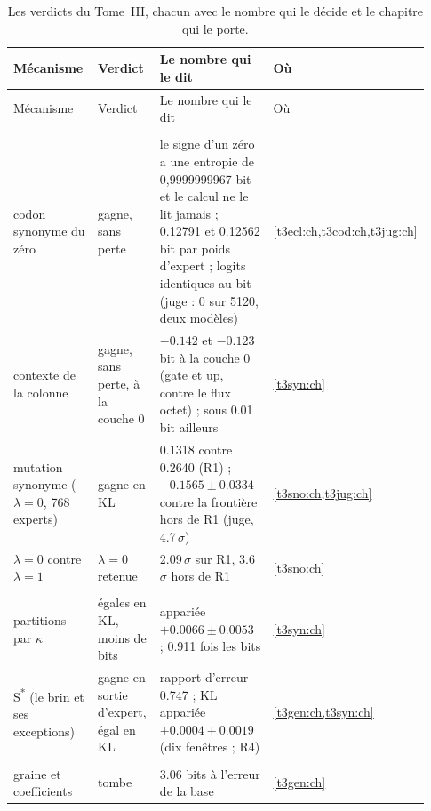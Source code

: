 \begingroup\footnotesize
\setlength{\tabcolsep}{4pt}
\begin{longtable}{@{}>{\raggedright\arraybackslash}p{0.25\linewidth}>{\raggedright\arraybackslash}p{0.17\linewidth}>{\raggedright\arraybackslash}p{0.40\linewidth}>{\raggedright\arraybackslash}p{0.11\linewidth}@{}}
\caption[Les verdicts du Tome~III]{Les verdicts du Tome~III, chacun avec le nombre qui le décide et le chapitre qui le porte.}\label{t3dis:tab:verdicts}\\
\toprule
Mécanisme & Verdict & Le nombre qui le dit & Où \\
\midrule
\endfirsthead
\toprule
Mécanisme & Verdict & Le nombre qui le dit & Où \\
\midrule
\endhead
\multicolumn{4}{@{}l}{\textsf{\bfseries Gagnent (les synonymes)}} \\
codon synonyme du zéro & gagne, sans perte & le signe d'un zéro a une entropie de 0,9999999967 bit et le calcul ne le lit jamais ; \num{0.12791} et \num{0.12562} bit par poids d'expert ; logits identiques au bit (juge : 0 sur \num{5120}, deux modèles) & \cref{t3ecl:ch,t3cod:ch,t3jug:ch} \\
contexte de la colonne & gagne, sans perte, à la couche 0 & $-\num{0.142}$ et $-\num{0.123}$ bit à la couche 0 (gate et up, contre le flux octet) ; sous \num{0.01} bit ailleurs & \cref{t3syn:ch} \\
mutation synonyme ($\lambda = 0$, 768 experts) & gagne en KL & \num{0.1318} contre \num{0.2640} (R1) ; $-\num{0.1565} \pm \num{0.0334}$ contre la frontière hors de R1 (juge, \num{4.7}\,$\sigma$) & \cref{t3sno:ch,t3jug:ch} \\
$\lambda = 0$ contre $\lambda = 1$ & $\lambda = 0$ retenue & \num{2.09}\,$\sigma$ sur R1, \num{3.6}\,$\sigma$ hors de R1 & \cref{t3sno:ch} \\
\multicolumn{4}{@{}l}{\textsf{\bfseries Égaux}} \\
partitions par $\kappa$ & égales en KL, moins de bits & appariée $+\num{0.0066} \pm \num{0.0053}$ ; \num{0.911} fois les bits & \cref{t3syn:ch} \\
S\textsuperscript{*} (le brin et ses exceptions) & gagne en sortie d'expert, égal en KL & rapport d'erreur \num{0.747} ; KL appariée $+\num{0.0004} \pm \num{0.0019}$ (dix fenêtres ; R4) & \cref{t3gen:ch,t3syn:ch} \\
\multicolumn{4}{@{}l}{\textsf{\bfseries Tombent}} \\
graine et coefficients & tombe & \num{3.06} bits à l'erreur de la base & \cref{t3gen:ch} \\

\end{longtable}

